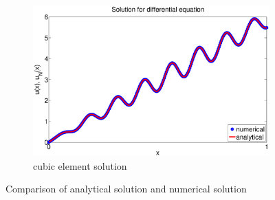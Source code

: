 \documentclass[paper=a4, fontsize=11pt]{article} %
\begin{document}
\begin{figure}
        \begin{subfigure}[b]{\textwidth}
                \includegraphics[width=\textwidth]{solution_P3.eps}
                \caption{cubic element solution}
                \label{fig:k8}
        \end{subfigure}

        \caption{Comparison of analytical solution and numerical solution}\label{fig:solution}
\end{figure}
\end{document}

